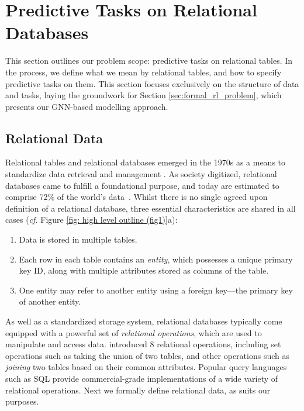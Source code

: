
\section{Predictive Tasks on Relational Databases}\label{sec: problem scope}

This section outlines our problem scope: predictive tasks on relational tables. In the process, we define what we mean by relational tables, and how to specify predictive tasks on them. This section focuses exclusively on the structure of data and tasks, laying the groundwork for Section \ref{sec:formal_rl_problem}, which presents our GNN-based modelling approach.


\subsection{Relational Data}
\label{sec:rel_dbs}

Relational tables and relational databases emerged in the 1970s as a means to standardize data retrieval and management \citep{codd1970relational}. As society digitized, relational databases came to fulfill a foundational purpose, and today are estimated to comprise 72\% of the world's data~\citep{db-engines}. Whilst there is no single agreed upon definition of a relational database, three essential characteristics are shared in all cases (\emph{cf.} Figure \ref{fig: high level outline (fig1)}a):
\begin{enumerate}
    \item Data is stored in multiple tables.
    \item Each row in each table contains an \emph{entity}, which possesses a unique primary key ID, along with multiple attributes stored as columns of the table.
    \item One entity may refer to another entity using a foreign key---the primary key of another entity.
\end{enumerate}

As well as a standardized storage system, relational databases typically come equipped with a powerful set of \emph{relational operations}, which are used to manipulate and access data. \cite{codd1970relational} introduced 8 relational operations, including set operations such as taking the union of two tables, and other operations such as \emph{joining} two tables based on their common attributes. Popular query languages such as SQL \citep{chamberlin1974sequel} provide commercial-grade implementations of a wide variety of relational operations.
Next we formally define relational data, as suits our purposes.


